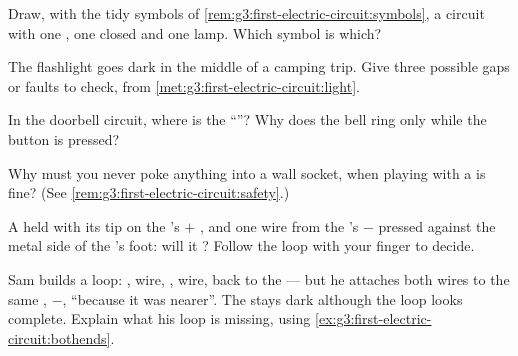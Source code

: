 \begin{exercise}[$\star$]\label{exo:g3:first-electric-circuit:5}
Draw, with the tidy symbols of
\cref{rem:g3:first-electric-circuit:symbols}, a circuit with one
, one closed  and one lamp. Which symbol is which?
\end{exercise}

\begin{exercise}[$\star$]\label{exo:g3:first-electric-circuit:6}
The flashlight goes dark in the middle of a camping trip. Give three
possible gaps or faults to check, from
\cref{met:g3:first-electric-circuit:light}.
\end{exercise}

\begin{exercise}[$\star$]\label{exo:g3:first-electric-circuit:7}
In the doorbell circuit, where is the ``''? Why does the bell
ring only while the button is pressed?
\end{exercise}

\begin{exercise}[$\star$]\label{exo:g3:first-electric-circuit:8}
Why must you never poke anything into a wall socket, when playing
with a  is fine? (See
\cref{rem:g3:first-electric-circuit:safety}.)
\end{exercise}

\begin{exercise}[$\star$]\label{exo:g3:first-electric-circuit:9}
A  held with its tip on the 's $+$ , and one wire
from the 's $-$  pressed against the metal side of
the 's foot: will it ? Follow the loop with your finger to
decide.
\end{exercise}

\begin{exercise}[$\star\star$]\label{exo:g3:first-electric-circuit:10}
Sam builds a loop: , wire, , wire, back to the 
--- but he attaches both wires to the same , $-$, ``because
it was nearer''. The  stays dark although the loop looks
complete. Explain what his loop is missing, using
\cref{ex:g3:first-electric-circuit:bothends}.
\end{exercise}

